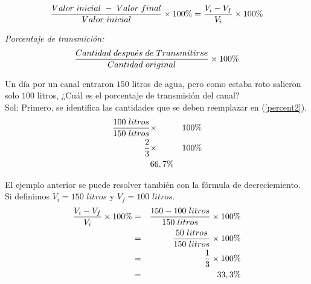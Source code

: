 \begin{eqnarray}
\dfrac{Valor\hspace{3px}inicial\hspace{3px}-\hspace{3px}Valor\hspace{3px}final}{Valor\hspace{3px}inicial}\times 100\%=\dfrac{V_{i}-V_{f}}{V_{i}}\times 100\%
\label{percent1}
\end{eqnarray}


\noindent \textit{Porcentaje de transmición:}\\

\begin{eqnarray}
\dfrac{Cantidad\hspace{3px}despu\acute{e} s\hspace{3px}de\hspace{3px}Transmitirse}{Cantidad\hspace{3px}original}\times 100\%
\label{percent2}
\end{eqnarray}

\begin{myexample}
Un día por un canal entraron $150$ litros de agua, pero como estaba roto salieron solo $100$ litros, ¿Cuál es el porcentaje de transmisión del canal?\\

Sol: Primero, se identifica las cantidades que se deben reemplazar en (\ref{percent2}). 
\begin{eqnarray*}
\dfrac{100 \hspace{3px}litros}{150\hspace{3px}litros}&\times & 100\%\\
\dfrac{2}{3}&\times & 100\%\\
& 66,7\% &
\end{eqnarray*}
\end{myexample}

\begin{myexample}
El ejemplo anterior se puede resolver también con la fórmula de decreciemiento. Si definimos $V_{i}=150$ $litros$ y $V_{f}=100$ $litros$. 
\begin{eqnarray*}
\dfrac{V_{i}-V_{f}}{V_{i}}\times 100\% &=&\dfrac{150-100\hspace{3px}litros}{150\hspace{3px}litros}\times 100\%\\
&=& \dfrac{50\hspace{3px}litros}{150\hspace{3px}litros}\times 100\%\\
&=&\dfrac{1}{3}\times 100\%\\
&=&33,3\%
\end{eqnarray*}
\end{myexample}

